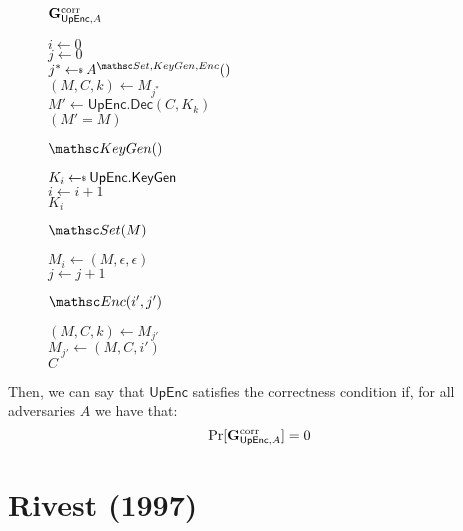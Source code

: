 \documentclass[11pt,twoside]{article}
\begin{document}
\begin{figure}[H]
{
\underline{$\mathbf{G}_{\mathsf{UpEnc},A}^\text{corr}$}

\begin{algorithm}[H]
$i\gets 0$\\
$j\gets 0$\\
$j^*\getsr A^{\procfont{Set,KeyGen,Enc}}()$\\
$(M,C,k)\gets M_{j^*}$\\
$M'\gets \mathsf{UpEnc.Dec}(C,K_k)$\\
\Return $(M'=M)$
\end{algorithm}


\underline{$\procfont{KeyGen}()$}

\begin{algorithm}[H]
$K_i\getsr \mathsf{UpEnc.KeyGen}$\\
$i\gets i+1$\\
\Return $K_i$
\end{algorithm}
}
{

\underline{$\procfont{Set}(M)$}

\begin{algorithm}[H]
$M_i\gets (M,\epsilon,\epsilon)$\\
$j\gets j+1$\\
\end{algorithm}

\underline{$\procfont{Enc}(i',j')$}

\begin{algorithm}[H]
$(M,C,k)\gets M_{j'}$\\
$M_{j'}\gets (M,C,i')$\\
\Return $C$
\end{algorithm}
}
\end{figure} 

Then, we can say that $\mathsf{UpEnc}$ satisfies the correctness condition if, for all adversaries $A$ we have that: 
$$\Pr [\mathbf{G}_{\mathsf{UpEnc},A}^\text{corr}]=0$$


\section{Rivest (1997)}
\end{document}
